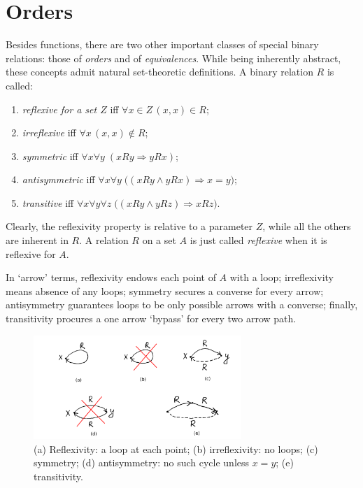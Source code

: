 \documentclass[12pt,notitlepage]{article}
\theoremstyle{plain}
\theoremstyle{definition}
\theoremstyle{plain}
\newcommand{\1}{\mathbf{1}}
\newcommand{\0}{\mathbf{0}}
\newcommand{\ply}{\Longrightarrow}
\newcommand{\mcomm}[1]{}
\begin{document}
\section{Orders}\label{sect:orders}
\mcomm{The two following  sections contain the most common concepts concerning orders, equivalence relations, and partitions. While these topics are abstract, their usefulness for most mathematical courses outweighs the students' likely frustration. To make things more bearable, the Instructor may widely use previous sections as a source of concrete examples and, on the other hand, apply combinatorics to finite orders and equivalences. To attain the latter goal, we count partitions of a finite set and prove Dilworth's Theorem.}


Besides functions, there are two other important classes of special binary relations: those of \emph{orders} and of \emph{equivalences}. While being inherently abstract, these concepts admit natural set-theoretic definitions. A binary relation $R$ is called:
\begin{enumerate}
\item \emph{reflexive for a set $Z$} iff $\forall x \in Z\, (x,x) \in R$;
\item \emph{irreflexive} iff $\forall x\, (x,x) \notin R$;
\item \emph{symmetric} iff $\forall x \forall y\; (x R y \ply y R x)$;
\item \emph{antisymmetric} iff $\forall x \forall y\; \bigl( (x R y \wedge y R x) \ply x = y \bigr)$;
\item \emph{transitive} iff $\forall x \forall y \forall z\; \bigl( (x R y \wedge y R z) \ply x R z \bigr)$.
\end{enumerate}
Clearly, the reflexivity property is relative to a parameter $Z$, while all the others are inherent in $R$. A relation $R$ on a set $A$ is just called \emph{reflexive} when it is reflexive for $A$.

In `arrow' terms, reflexivity endows each point of $A$ with a loop; irreflexivity means absence of any loops; symmetry secures a converse for every arrow; antisymmetry guarantees loops to be only possible arrows with a converse; finally, transitivity procures a one arrow `bypass' for every two arrow path.

\begin{figure}[h]
\centering
\includegraphics*[width=0.7\textwidth]{ord_refl.pdf}
\caption{(a) Reflexivity: a loop at each point; (b) irreflexivity: no loops; (c) symmetry; (d) antisymmetry: no such cycle unless $x = y$; (e) transitivity.}
\end{figure}
\end{document}
